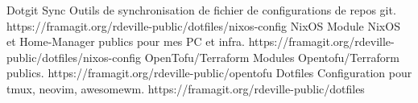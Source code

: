 \project
{Dotgit Sync}
{Outils de synchronisation de fichier de configurations de repos git.}
{%
}
{https://framagit.org/rdeville-public/dotfiles/nixos-config}
\project%
{NixOS}%
{Module NixOS et Home-Manager publics pour mes PC et infra.}%
{%
}%
{https://framagit.org/rdeville-public/dotfiles/nixos-config}
\project%
{OpenTofu/Terraform}%
{Modules Opentofu/Terraform publics.}%
{%
}%
{https://framagit.org/rdeville-public/opentofu}
\project%
{Dotfiles}%
{Configuration pour tmux, neovim, awesomewm.}%
{%
}%
{https://framagit.org/rdeville-public/dotfiles}
